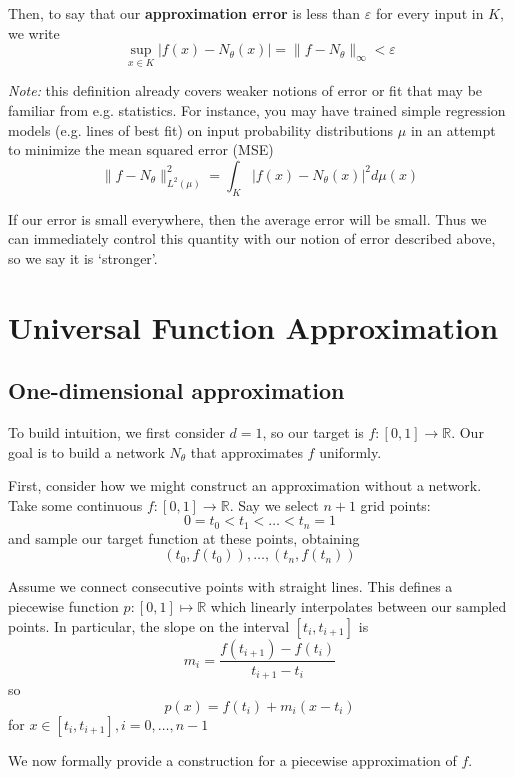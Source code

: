 \documentclass{article}
\theoremstyle{definition}
\newcommand{\note}{\textit{Note: }}
\begin{document}
Then, to say that our \textbf{approximation error} is less than $\varepsilon$ for every input in $K$, we write
$$\sup_{x \in K} |f(x) - N_\theta(x)| = \|f - N_\theta\|_\infty < \varepsilon$$

\begin{aside}
\note this definition already covers weaker notions of error or fit that may be familiar from e.g. statistics. For instance, you may have trained simple regression models (e.g. lines of best fit) on input probability distributions $\mu$ in an attempt to minimize the mean squared error (MSE)
$$\|f-N_\theta\|_{L^2(\mu)}^2 = \int_K |f(x) - N_\theta(x)|^2 d\mu(x)$$

If our error is small everywhere, then the average error will be small. Thus we can immediately control this quantity with our notion of error described above, so we say it is `stronger'.
\end{aside}

\section{Universal Function Approximation}

\subsection{One-dimensional approximation}

To build intuition, we first consider $d=1$, so our target is $f : [0, 1] \to \mathbb{R}$. Our goal is to build a network $N_\theta$ that approximates $f$ uniformly.

First, consider how we might construct an approximation without a network. Take some continuous $f : [0, 1] \to \mathbb{R}$. Say we select $n + 1$ grid points:
$$0 = t_0 < t_1 < \dots < t_n = 1$$
and sample our target function at these points, obtaining
$$(t_0, f(t_0)), \dots, (t_n, f(t_n))$$

Assume we connect consecutive points with straight lines. This defines a piecewise function $p : [0, 1] \mapsto \mathbb{R}$ which linearly interpolates between our sampled points. In particular, the slope on the interval $[t_i, t_{i+1}]$ is
$$m_i = \frac{f(t_{i+1}) - f(t_i)}{t_{i+1} - t_i}$$
so
$$p(x) = f(t_i) + m_i(x - t_i)$$
for $x \in [t_i, t_{i+1}], i=0, \dots, n-1$

We now formally provide a construction for a piecewise approximation of $f$.
\end{document}
